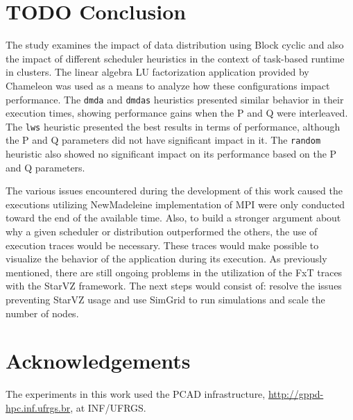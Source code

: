 \documentclass[conference, 10pt, final]{IEEEtran}
\begin{document}
\section{{\bfseries\sffamily TODO} Conclusion}
\label{sec:conclusion}
The study examines the impact of data distribution using Block cyclic and also the impact of different scheduler heuristics in the context of task-based runtime in clusters. The linear algebra LU factorization application provided by Chameleon was used as a means to analyze how these configurations impact performance. The \verb|dmda| and \verb|dmdas| heuristics presented similar behavior in their execution times, showing performance gains when the P and Q were interleaved. The \verb|lws| heuristic presented the best results in terms of performance, although the P and Q parameters did not have significant impact in it. The \verb|random| heuristic also showed no significant impact on its performance based on the P and Q parameters.

The various issues encountered during the development of this work caused the executions utilizing NewMadeleine implementation of MPI were only conducted toward the end of the available time. Also, to build a stronger argument about why a given scheduler or distribution outperformed the others, the use of execution traces would be necessary. These traces would make possible to visualize the behavior of the application during its execution. As previously mentioned, there are still ongoing problems in the utilization of the FxT traces with the StarVZ framework. The next steps would consist of: resolve the issues preventing StarVZ usage and use SimGrid \cite{CASANOVA2025103125} to run simulations and scale the number of nodes.
\section*{Acknowledgements}

The experiments in this work used the PCAD infrastructure, \url{http://gppd-hpc.inf.ufrgs.br}, at INF/UFRGS.
\clearpage



\end{document}

